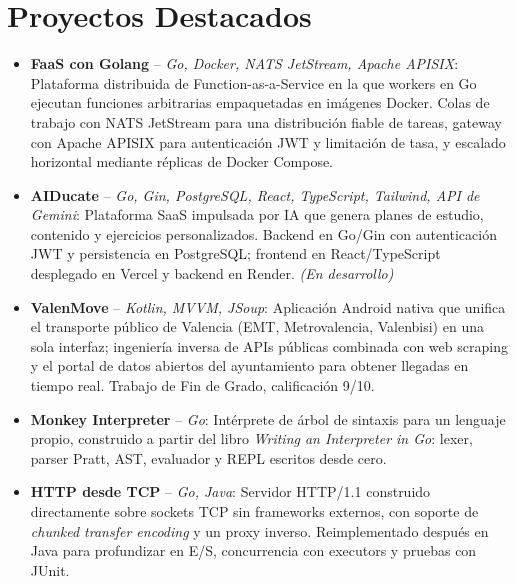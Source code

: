 \documentclass[11pt,a4paper,sans]{moderncv}
\begin{document}

\section{Proyectos Destacados}
\vspace{1pt}
\begin{itemize}

\item \textbf{FaaS con Golang} -- \textit{Go, Docker, NATS JetStream, Apache APISIX}: Plataforma distribuida de Function-as-a-Service en la que workers en Go ejecutan funciones arbitrarias empaquetadas en imágenes Docker. Colas de trabajo con NATS JetStream para una distribución fiable de tareas, gateway con Apache APISIX para autenticación JWT y limitación de tasa, y escalado horizontal mediante réplicas de Docker Compose.

\item \textbf{AIDucate} -- \textit{Go, Gin, PostgreSQL, React, TypeScript, Tailwind, API de Gemini}: Plataforma SaaS impulsada por IA que genera planes de estudio, contenido y ejercicios personalizados. Backend en Go/Gin con autenticación JWT y persistencia en PostgreSQL; frontend en React/TypeScript desplegado en Vercel y backend en Render. \textit{(En desarrollo)}

\item \textbf{ValenMove} -- \textit{Kotlin, MVVM, JSoup}: Aplicación Android nativa que unifica el transporte público de Valencia (EMT, Metrovalencia, Valenbisi) en una sola interfaz; ingeniería inversa de APIs públicas combinada con web scraping y el portal de datos abiertos del ayuntamiento para obtener llegadas en tiempo real. Trabajo de Fin de Grado, calificación 9/10.

\item \textbf{Monkey Interpreter} -- \textit{Go}: Intérprete de árbol de sintaxis para un lenguaje propio, construido a partir del libro \textit{Writing an Interpreter in Go}: lexer, parser Pratt, AST, evaluador y REPL escritos desde cero.

\item \textbf{HTTP desde TCP} -- \textit{Go, Java}: Servidor HTTP/1.1 construido directamente sobre sockets TCP sin frameworks externos, con soporte de \textit{chunked transfer encoding} y un proxy inverso. Reimplementado después en Java para profundizar en E/S, concurrencia con executors y pruebas con JUnit.


\end{itemize}
\end{document}
